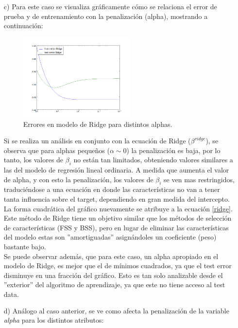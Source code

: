 \documentclass[10pt]{article}
\begin{document}
\begin{itemize}
\item[c)] Para este caso se visualiza gráficamente cómo se relaciona el error de prueba y de entrenamiento con la penalización (alpha), mostrando a continuación:\\

\begin{figure}[h]
    \centering
    \includegraphics[width=0.55\textwidth]{images/alphas_ridge}
    \caption{Errores en modelo de Ridge para distintos alphas.}
    \label{err:ridge}
\end{figure}

Si se realiza un análisis en conjunto con la ecuación de Ridge ($\beta^{ridge}$), se observa que para alphas pequeños ($\alpha \sim 0$) la penalización es baja, por lo tanto, los valores de $\beta_i$ no están tan limitados, obteniendo valores similares a las del modelo de regresión lineal ordinaria. A medida que aumenta el valor de alpha, y con esto la penalización, los valores de $\beta_i$ se ven mas restringidos, traduciéndose a una ecuación en donde las características no van a tener tanta influencia sobre el target, dependiendo en gran medida del intercepto. \\

La forma cuadrática del gráfico nuevamente se atribuye a la ecuación \eqref{ridge}. Este método de Ridge tiene un objetivo similar que los métodos de selección de características (FSS y BSS), pero en lugar de eliminar las características del modelo estas son ''amortiguadas'' asignándoles un coeficiente (peso) bastante bajo.\\
Se puede observar además, que para este caso, un alpha apropiado en el modelo de Ridge, es mejor que el de mínimos cuadrados, ya que el test error disminuye en una fracción del gráfico. Esto es tan solo analizable desde el ''exterior'' del algoritmo de aprendizaje, ya que este no tiene acceso al test data.


\item[d)] Análogo al caso anterior, se ve como afecta la penalización de la variable \textit{alpha} para los distintos atributos:


\end{itemize}
\end{document}
